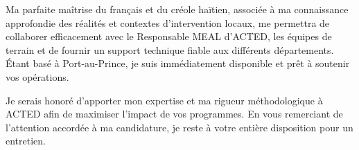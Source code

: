 \documentclass[11pt,a4paper,sans]{moderncv}
\begin{document}
Ma parfaite maîtrise du français et du créole haïtien, associée à ma connaissance approfondie des réalités et contextes d'intervention locaux, me permettra de collaborer efficacement avec le Responsable MEAL d'ACTED, les équipes de terrain et de fournir un support technique fiable aux différents départements. Étant basé à Port-au-Prince, je suis immédiatement disponible et prêt à soutenir vos opérations.

Je serais honoré d'apporter mon expertise et ma rigueur méthodologique à ACTED afin de maximiser l'impact de vos programmes. En vous remerciant de l'attention accordée à ma candidature, je reste à votre entière disposition pour un entretien.

\makeletterclosing
\end{document}

